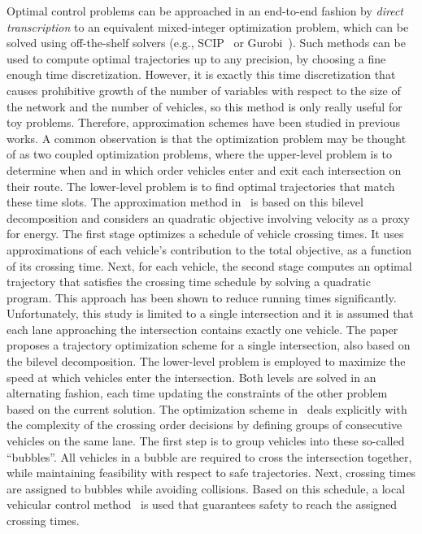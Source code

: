 \documentclass[a4paper]{article}
\theoremstyle{definition}
\theoremstyle{plain}
\begin{document}
Optimal control problems can be approached in an end-to-end fashion by
\textit{direct transcription} to an equivalent mixed-integer optimization
problem, which can be solved using off-the-shelf solvers (e.g., SCIP~\cite{BolusaniEtal2024OO} or
Gurobi~\cite{gurobi}). Such methods can be used to compute optimal trajectories up to any
precision, by choosing a fine enough time discretization. However, it is exactly
this time discretization that causes prohibitive growth of the number of
variables with respect to the size of the network and the number of vehicles, so
this method is only really useful for toy problems.
%
Therefore, approximation schemes have been studied in previous works. A common
observation is that the optimization problem may be thought of as two coupled
optimization problems, where the upper-level problem is to determine when and in
which order vehicles enter and exit each intersection on their route. The
lower-level problem is to find optimal trajectories that match these time slots.
The approximation method in~\cite{hultApproximateSolutionOptimal2015} is based
on this bilevel decomposition and considers an quadratic objective involving
velocity as a proxy for energy. The first stage optimizes a schedule of vehicle
crossing times. It uses approximations of each vehicle's contribution to the
total objective, as a function of its crossing time. Next, for each vehicle, the
second stage computes an optimal trajectory that satisfies the crossing time
schedule by solving a quadratic program. This approach has been shown to reduce
running times significantly. Unfortunately, this study is limited to a single
intersection and it is assumed that each lane approaching the intersection
contains exactly one vehicle.
The paper~\cite{zhaoBilevelProgrammingModel2021} proposes a trajectory
optimization scheme for a single intersection, also based on the bilevel
decomposition. The lower-level problem is employed to maximize the speed at
which vehicles enter the intersection. Both levels are solved in an alternating
fashion, each time updating the constraints of the other problem based on the
current solution.
The optimization scheme
in~\cite{tallapragadaHierarchicaldistributedOptimizedCoordination2017} deals
explicitly with the complexity of the crossing order decisions by defining
groups of consecutive vehicles on the same lane. The first step is to group
vehicles into these so-called ``bubbles''. All vehicles in a bubble are required
to cross the intersection together, while maintaining feasibility with respect
to safe trajectories. Next, crossing times are assigned to bubbles while
avoiding collisions. Based on this schedule, a local vehicular control
method~\cite{tallapragadaDistributedControlVehicle2017} is used that guarantees
safety to reach the assigned crossing times.
\end{document}

